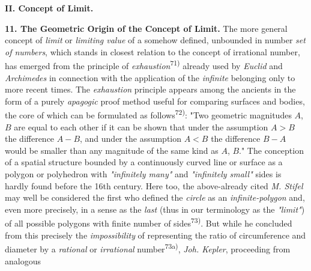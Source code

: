 \thispagestyle{fancy}

\vspace{0.5cm}

\begin{center}
    \textbf{II. Concept of Limit.}
\end{center}



\textbf{11. The Geometric Origin of the Concept of Limit.} The more general concept of \textit{limit} or \textit{limiting value} of a somehow defined, unbounded in number \textit{set of numbers}, which stands in closest relation to the concept of irrational number, has emerged from the principle of \textit{exhaustion}\textsuperscript{71)} already used by \textit{Euclid} and \textit{Archimedes} in connection with the application of the \textit{infinite} belonging only to more recent times. The \textit{exhaustion} principle appears among the ancients in the form of a purely \textit{apagogic} proof method useful for comparing surfaces and bodies, the core of which can be formulated as follows\textsuperscript{72)}: "Two geometric magnitudes $A$, $B$ are equal to each other if it can be shown that under the assumption $A > B$ the difference $A - B$, and under the assumption $A < B$ the difference $B - A$ would be smaller than any magnitude of the same kind as $A$, $B$." The conception of a spatial structure bounded by a continuously curved line or surface as a polygon or polyhedron with \textit{"infinitely many"} and \textit{"infinitely small"} sides is hardly found before the 16th century. Here too, the above-already cited \textit{M. Stifel} may well be considered the first who defined the \textit{circle} as an \textit{infinite-polygon} and, even more precisely, in a sense as the \textit{last} (thus in our terminology as the \textit{"limit"}) of all possible polygons with finite number of sides\textsuperscript{73)}. But while he concluded from this precisely the \textit{impossibility} of representing the ratio of circumference and diameter by a \textit{rational} or \textit{irrational} number\textsuperscript{73a)}, \textit{Joh. Kepler}, proceeding from analogous


